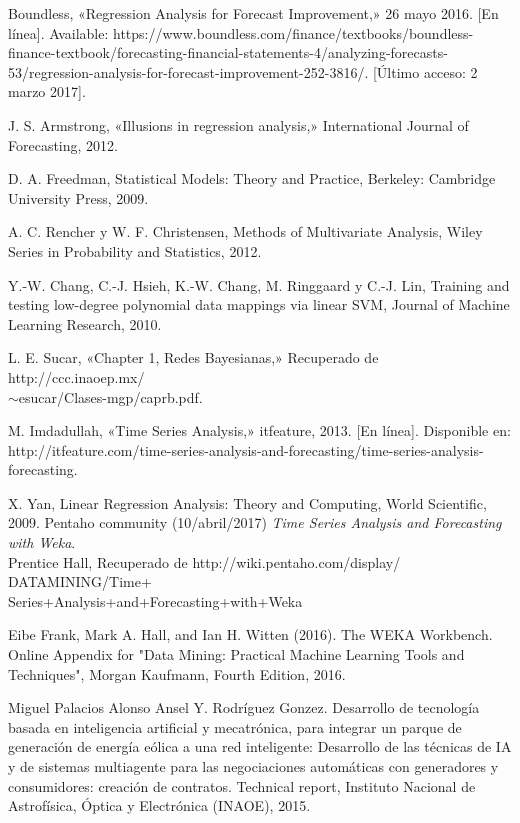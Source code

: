 \begin{thebibliography}{a}
	Boundless, «Regression Analysis for Forecast Improvement,» 26 mayo 2016. [En línea].
Available: https://www.boundless.com/finance/textbooks/boundless-finance-textbook/forecasting-financial-statements-4/analyzing-forecasts-53/regression-analysis-for-forecast-improvement-252-3816/. [Último acceso: 2 marzo 2017].

	 J. S. Armstrong, «Illusions in regression analysis,» International Journal of Forecasting, 2012.

	 D. A. Freedman, Statistical Models: Theory and Practice, Berkeley: Cambridge University Press, 2009.
		
	 A. C. Rencher y W. F. Christensen, Methods of Multivariate Analysis, Wiley Series in Probability and Statistics, 2012.

	 Y.-W. Chang, C.-J. Hsieh, K.-W. Chang, M. Ringgaard y C.-J. Lin, Training and testing low-degree
polynomial data mappings via linear SVM, Journal of Machine Learning Research, 2010.
	
	 L. E. Sucar, «Chapter 1, Redes Bayesianas,» Recuperado de
	http://ccc.inaoep.mx/\\$\sim$esucar/Clases-mgp/caprb.pdf. %

	 M. Imdadullah, «Time Series Analysis,» itfeature, 2013. [En línea]. Disponible en:
http://itfeature.com/time-series-analysis-and-forecasting/time-series-analysis-forecasting.

	 X. Yan, Linear Regression Analysis: Theory and Computing, World Scientific,
2009.
	  Pentaho community (10/abril/2017) {\it Time Series Analysis and
	Forecasting with Weka}.\\ Prentice Hall, Recuperado de http://wiki.pentaho.com/display/
	DATAMINING/Time+\\Series+Analysis+and+Forecasting+with+Weka
	
	
	Eibe Frank, Mark A. Hall, and Ian H. Witten (2016). The WEKA Workbench. Online Appendix for "Data Mining: Practical Machine Learning Tools and Techniques", Morgan Kaufmann, Fourth Edition, 2016. 
	
	 Miguel Palacios Alonso Ansel Y. Rodríguez Gonzez. Desarrollo de tecnología basada en inteligencia artificial y mecatrónica, para integrar un parque de generación de energía eólica a una red inteligente: 
	Desarrollo de las técnicas de IA y de sistemas multiagente para las negociaciones automáticas con generadores y consumidores: creación de contratos.
	Technical report, Instituto Nacional de Astrofísica, Óptica y Electrónica (INAOE), 2015.
	

\end{thebibliography}
